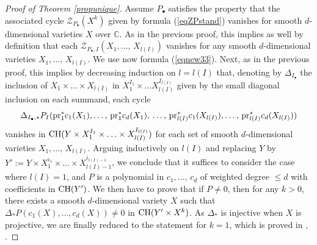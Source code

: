 \documentclass[10pt]{article}
\begin{document}
\begin{proof}[Proof of Theorem \ref{propunique}] Assume $P_\bullet$ satisfies the property that the associated cycle
$\mathcal{Z}_{P_\bullet}(X^k)$ given by formula (\ref{eqZPstand}) vanishes for smooth $d$-dimensional varieties
$X$ over $\mathbb{C}$. As in the previous proof, this implies as well by definition that each
$\mathcal{Z}_{P_\bullet,I}(X_1,\ldots,\, X_{l(I)})$ vanishes for any smooth $d$-dimensional varieties $X_1,\ldots,\,X_{l(I)}$.
 We use now formula (\ref{eqnew33}). Next, as in the previous proof, this  implies by decreasing induction on
 $l=l(I)$  that, denoting by
 $\Delta_{I_\bullet}$ the inclusion of
 $X_1\times\ldots\times X_{l(I)}$ in $X_1^{I_1}\times\ldots X_{l(I)}^{I_{l(I)}}$ given by the small diagonal inclusion on each summand, each cycle
  $$\Delta_{I_\bullet,*}P_I({\rm pr}_1^*c_{1}(X_1),\ldots,\,{\rm pr}_1^*c_{d}(X_1),\,\ldots,\,{\rm pr}_{l(I)}^*c_{1}(X_{l(I)}),\ldots,\,{\rm pr}_{l(I)}^*c_{d}(X_{l(I)}))$$ vanishes in ${\rm CH}(Y\times X_1^{I_1}\times\ldots\times X_{l(I)}^{I_{l(I)}})$ for each set of smooth $d$-dimensional varieties $X_1,\ldots,\,X_{l(I)}$.
  Arguing inductively on $l(I)$ and replacing $Y$  by $Y':=Y\times X_1^{i_1}\times\ldots\times X_{l(I)-1}^{i_{l(I)-1}}$, we conclude that it suffices to consider the case
  where $l(I)=1$, and  $P$ is a polynomial in $c_1,\ldots,\,c_d$ of weighted degree $\leq d$ with coefficients in
  ${\rm CH}(Y')$. We then have to prove that if $P\not=0$, then for any $k>0$, there exists a smooth
   $d$-dimensional variety $X$ such that
  $\Delta_*P(c_1(X),\dots,c_d(X))\not=0$ in ${\rm CH}(Y'\times X^k)$.
  As $\Delta_*$ is injective when $X$ is projective, we are finally reduced to  the statement for $k=1$, which is
  proved in  \cite{thom}, \cite{milnor}.
\end{proof}
\end{document}
